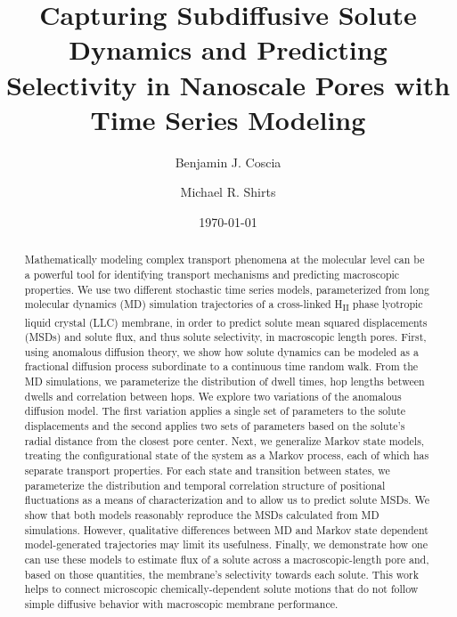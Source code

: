 \documentclass[aps,pre,preprint,groupedaddress]{revtex4-2}
\begin{document}
  
  \title{Capturing Subdiffusive Solute Dynamics and Predicting Selectivity in Nanoscale Pores
  with Time Series Modeling}
  
  \author{Benjamin J. Coscia}
  \author{Michael R. Shirts}
  

  \date{\today}
  
  \begin{abstract}
  
  Mathematically modeling complex transport phenomena at the molecular level 
  can be a powerful tool for identifying transport mechanisms and predicting
  macroscopic properties. We use two different stochastic time series models,
  parameterized from long molecular dynamics (MD) simulation trajectories of
  a cross-linked H\textsubscript{II} phase lyotropic liquid crystal (LLC) 
  membrane, in order to predict solute mean squared displacements (MSDs) 
  and solute flux, and thus solute selectivity, in macroscopic length pores. 
  First, using anomalous diffusion theory, we show how solute dynamics can be
  modeled as a fractional diffusion process subordinate to a continuous time 
  random walk. From the MD simulations, we parameterize the distribution of 
  dwell times, hop lengths between dwells and correlation between hops. We 
  explore two variations of the anomalous diffusion model. The first variation
  applies a single set of parameters to the solute displacements and the second
  applies two sets of parameters based on the solute's radial distance from the
  closest pore center. Next, we generalize Markov state models, treating the
  configurational state of the system as a Markov process, each
  of which has separate transport properties. For each state and transition
  between states, we parameterize the distribution and temporal correlation 
  structure of positional fluctuations as a means of characterization and to 
  allow us to predict solute MSDs. We show that both models reasonably reproduce
  the MSDs calculated from MD simulations. However, qualitative differences 
  between MD and Markov state dependent model-generated trajectories may limit 
  its usefulness. Finally, we demonstrate how one can use these models to 
  estimate flux of a solute across a macroscopic-length pore and, based on 
  those quantities, the membrane's selectivity towards each solute. This work 
  helps to connect microscopic chemically-dependent solute motions that do not
  follow simple diffusive behavior with macroscopic membrane performance.

  \end{abstract}
\end{document}
